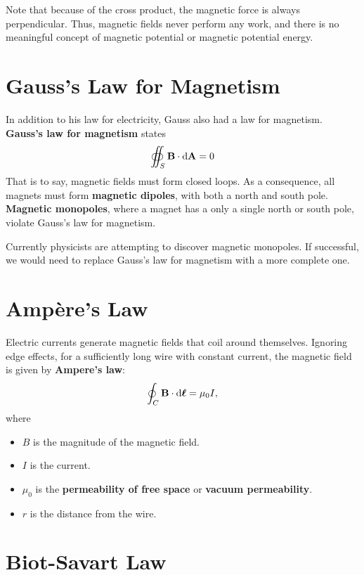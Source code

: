 Note that because of the cross product,
the magnetic force is always perpendicular.
Thus, magnetic fields never perform any work,
and there is no meaningful concept of magnetic potential
or magnetic potential energy.

\section{Gauss's Law for Magnetism}

In addition to his law for electricity, Gauss also had a law for magnetism.
\textbf{Gauss's law for magnetism} states
\begin{equation} \label{eq:gausss-law-magnetism}
    \oiint_S \vec{B} \cdot \odif{\vec{A}} = 0
\end{equation}
That is to say, magnetic fields must form closed loops.
As a consequence, all magnets must form \textbf{magnetic dipoles},
with both a north and south pole.
\textbf{Magnetic monopoles},
where a magnet has a only a single north or south pole,
violate Gauss's law for magnetism.

Currently physicists are attempting to discover magnetic monopoles.
If successful,
we would need to replace Gauss's law for magnetism with a more complete one.

\section{Ampère's Law}

Electric currents generate magnetic fields that coil around themselves.
Ignoring edge effects, for a sufficiently long wire with constant current,
the magnetic field is given by \textbf{Ampere's law}:
\begin{equation} \label{eq:amperes-law}
    \oint_C \vec{B} \cdot \odif{\vec{\ell}} = \mu_0 I,
\end{equation}
where
\begin{itemize}
    \item \(B\) is the magnitude of the magnetic field.
    \item \(I\) is the current.
    \item \(\mu_0\) is the \textbf{permeability of free space} or
        \textbf{vacuum permeability}.
    \item \(r\) is the distance from the wire.
\end{itemize}

\section{Biot-Savart Law}

